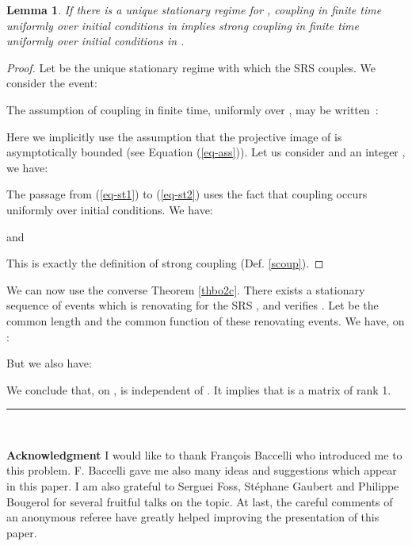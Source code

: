 \documentclass[11pt,titlepage]{article}
\def\eref#1{(\ref{#1})}
\newcommand{\parag}{\medskip\noindent}
\newcommand{\cqfd}{\hspace*{\fill}\rule{1.8mm}{1.8mm} \\ }
\newtheorem{lemm}[theo]{Lemma }
\begin{document}
\begin{lemm}
If there is a unique stationary regime 
for , coupling in finite time uniformly over
initial conditions in  implies strong coupling in finite time uniformly
over initial conditions in .
\end{lemm}

\begin{proof} Let  be the unique stationary regime with
which the SRS  couples.
We consider the event:

The assumption of coupling in
finite time, uniformly over , may be written~:

Here we implicitly use the assumption that the projective image of
 is asymptotically bounded (see 
Equation \eref{eq-ass}).
Let us consider  and  an integer
, we have:

The passage from \eref{eq-st1} to \eref{eq-st2} uses
the fact that coupling occurs uniformly over
initial conditions. We have:

and

This is exactly the definition of strong coupling (Def. \ref{scoup}).
\end{proof} 

We can now use the converse Theorem \ref{thbo2c}. There exists a stationary
sequence of 
events  which is renovating for the SRS , and verifies . Let  be
the common length and  the common function of these renovating events.
We have, on :

But we also have:

We conclude that, on ,  is independent of . It implies 
that  is a 
matrix of rank 1. \cqfd


\parag
\parag

{\bf Acknowledgment } I would like to thank Fran\c{c}ois Baccelli who
introduced me to this problem. 
F. Baccelli gave me also many ideas and suggestions which appear in this
paper. I am also grateful to Serguei Foss, St\'ephane Gaubert 
and Philippe Bougerol for 
several fruitful talks on the topic. At last, the careful comments of an
anonymous referee have greatly helped improving the presentation of this paper.
\end{document}
